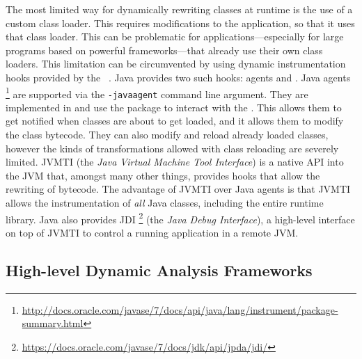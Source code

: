 The most limited way for dynamically rewriting \java{} classes at runtime
is the use of a custom class loader.
This requires modifications to the application,
so that it uses that class loader.
This can be problematic for applications---especially for large programs
based on powerful frameworks---that already use their own class loaders.
This limitation can be circumvented by using dynamic instrumentation
hooks provided by the \jvm{}~\citep{lindholmJavaVirtualMachine}.
Java provides two such hooks: \java{} agents and \jvmti{}.
Java agents%
\footnote{\url{http://docs.oracle.com/javase/7/docs/api/java/lang/instrument/package-summary.html}} 
are supported via the \texttt{-javaagent} \jvm{} command line argument.
They are implemented in \java{} and use the  package to interact with the \jvm{}.
This allows them to get notified when classes are about to get loaded,
and it allows them to modify the class bytecode.
They can also modify and reload already loaded classes,
however the kinds of transformations allowed with class reloading are severely limited.
JVMTI (the \emph{Java Virtual Machine Tool Interface}) is a native API into the JVM that, 
amongst many other things, provides hooks that allow the
rewriting of bytecode.
The advantage of JVMTI over Java agents is that JVMTI allows the instrumentation of \emph{all} Java classes, including the entire runtime library.
Java also provides JDI%
\footnote{\url{https://docs.oracle.com/javase/7/docs/jdk/api/jpda/jdi/}}
(the \emph{Java Debug Interface}), 
a high-level interface on top of JVMTI to control a running application in a remote JVM.

\subsection*{High-level Dynamic Analysis Frameworks}


